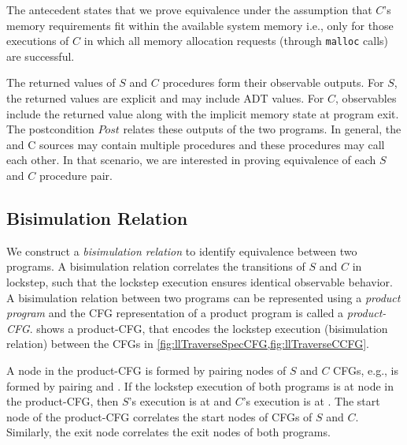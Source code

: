 The \cfits{} antecedent states that we prove equivalence under the assumption that $C$'s memory
requirements fit within the available system memory i.e., only for those executions of $C$
in which all memory allocation requests (through {\tt malloc} calls) are successful.

The returned values of $S$ and $C$ procedures form their observable outputs.
For $S$, the returned values are explicit and may include ADT values.
For $C$, observables include the returned value along with the implicit memory state
at program exit.
The postcondition $Post$ relates these outputs of the two programs.
In general, the \SpecL{} and C sources may contain multiple procedures and these
procedures may call each other.
In that scenario, we are interested in proving equivalence of each $S$ and $C$ procedure pair.



\subsection{Bisimulation Relation}
\label{sec:bisim}
We construct a {\em bisimulation relation} to identify equivalence between two programs.
A bisimulation relation correlates the transitions of $S$ and $C$ in lockstep, such that the
lockstep execution ensures identical observable behavior.
A bisimulation relation between two programs can be represented using a {\em product program}
\cite{covac} and the CFG representation of a product program is called a {\em product-CFG}.
 shows a product-CFG, that encodes the lockstep execution
(bisimulation relation) between the CFGs in \cref{fig:llTraverseSpecCFG,fig:llTraverseCCFG}.

A node in the product-CFG is formed by pairing nodes of $S$ and $C$ CFGs,
e.g.,  is formed by pairing  and .
If the lockstep execution of both programs is at node  in the product-CFG,
then $S$'s execution is at  and $C$'s execution is at .
The start node  of the product-CFG correlates the start nodes of CFGs of $S$ and $C$.
Similarly, the exit node  correlates the exit nodes of both programs.

